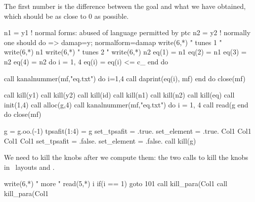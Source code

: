 The first number is the difference between the goal and what we have
obtained, which should be as close to 0 as possible.

\begin{ptccode}
n1 = y1 ! normal forms: abused of language permitted by ptc
n2 = y2 ! normally one should do => damap=y; normalform=damap
write(6,*) " tunes 1 "
write(6,*) n1%
write(6,*) " tunes 2 "
write(6,*) n2%
eq(1) = n1%
eq(2) = n1%
eq(3) = n2%
eq(4) = n2%
do i = 1, 4
  eq(i) = eq(i) <= c_%
end do

call kanalnummer(mf,"eq.txt")
do i=1,4
  call daprint(eq(i), mf)
end do
close(mf)

call kill(y1)
call kill(y2)
call kill(id)
call kill(n1)
call kill(n2)
call kill(eq)
call init(1,4)
call alloc(g,4)
call kanalnummer(mf,"eq.txt")
do i = 1, 4
  call read(g%
end do
close(mf)

g = g.oo.(-1)
tpsafit(1:4) = g
set_tpsafit = .true.
set_element = .true.
Col1%
Col1%
Col1%
Col1%
set_tpsafit = .false.
set_element = .false.
call kill(g)
\end{ptccode}

We need to kill the knobs after we compute them: the two calls to
 kill the knobs in \DNA\ layouts  and
.

\begin{ptccode}
write(6,*) " more "
read(5,*) i
if(i == 1) goto 101
call kill_para(Col1%
call kill_para(Col1%
\end{ptccode}

\makeussubscript
\endinput
